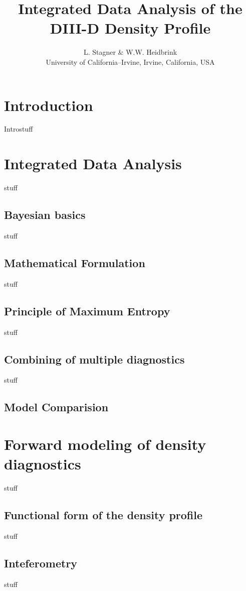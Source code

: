 \documentclass	[12pt]{article}
\begin{document}
\title{\bf{Integrated Data Analysis of the DIII-D Density Profile}}
\author{L. Stagner \& W.W. Heidbrink \\ University of California--Irvine, Irvine, California, USA}
\date{}
\maketitle
\begin{abstract}
\end{abstract}
\section{Introduction}
Introstuff \cite{sivia2006data}

\section{Integrated Data Analysis}
stuff
\subsection{Bayesian basics}
stuff
\subsection{Mathematical Formulation}
stuff
\subsection{Principle of Maximum Entropy}
stuff
\subsection{Combining of multiple diagnostics}
stuff
\subsection{Model Comparision}

\section{Forward modeling of density diagnostics}
stuff
\subsection{Functional form of the density profile}
stuff
\subsection{Inteferometry}
stuff
\end{document}
